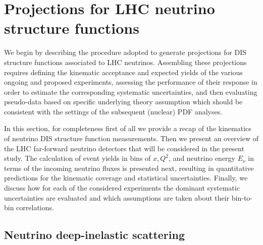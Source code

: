 \section{Projections for LHC neutrino structure functions}
\label{sec:dis_pseudodata}

We begin by describing the procedure adopted to generate
projections for DIS structure functions associated to LHC neutrinos.
%
Assembling these projections requires defining the kinematic acceptance
and expected yields of the various ongoing and proposed experiments,
assessing the performance of their response in order to estimate
the corresponding systematic uncertainties,
and then evaluating pseudo-data based on specific underlying theory assumption which should be consistent
with the settings of the subsequent (nuclear) PDF analyses.

In this section, for completeness first of all we provide a recap of the kinematics
of neutrino DIS structure function measurements.
%
Then we present an overview of the LHC far-forward neutrino detectors that
will be considered in the present study.
%
The calculation of event yields in bins of $x,Q^2$, and neutrino energy $E_\nu$ in terms
of the incoming neutrino fluxes is presented next, resulting in quantitative predictions
for the kinematic coverage and statistical uncertainties.
%
Finally, we discuss how for each of the considered experiments the dominant systematic
uncertainties are evaluated and which assumptions are taken about their bin-to-bin correlations.


\subsection{Neutrino deep-inelastic scattering}

